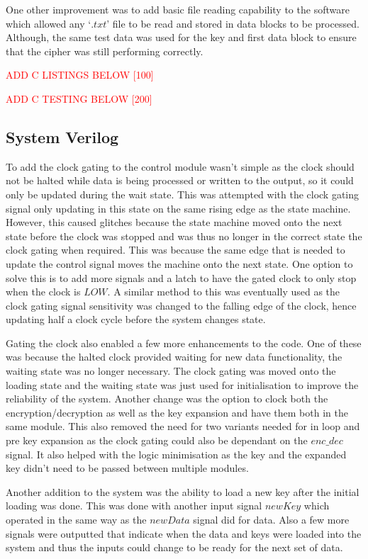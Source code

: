 \documentclass[12pt,twoside,a4paper]{report}
\begin{document}
	One other improvement was to add basic file reading capability to the software which allowed any  `$.txt$' file to be read and stored in data blocks to be processed. Although, the same test data was used for the key and first data block to ensure that the cipher was still performing correctly.
	
	\textcolor{red}{ADD C LISTINGS BELOW [100]}
    
	\textcolor{red}{ADD C TESTING BELOW [200]}   
    
	\subsection{System Verilog}
	\label{subsection:SV2}
	
	To add the clock gating to the control module wasn't simple as the clock should not be halted while data is being processed or written to the output, so it could only be updated during the wait state. This was attempted with the clock gating signal only updating in this state on the same rising edge as the state machine. However, this caused glitches because the state machine moved onto the next state before the clock was stopped and was thus no longer in the correct state the clock gating when required. This was because the same edge that is needed to update the control signal moves the machine onto the next state. One option to solve this is to add more signals and a latch to have the gated clock to only stop when the clock is $LOW$. A similar method to this was eventually used as the clock gating signal sensitivity was changed to the falling edge of the clock, hence updating half a clock cycle before the system changes state.
	
	Gating the clock also enabled a few more enhancements to the code. One of these was because the halted clock provided waiting for new data functionality, the waiting state was no longer necessary. The clock gating was moved onto the loading state and the waiting state was just used for initialisation to improve the reliability of the system. Another change was the option to clock both the encryption/decryption as well as the key expansion and have them both in the same module. This also removed the need for two variants needed for in loop and pre key expansion as the clock gating could also be dependant on the $enc\_dec$ signal. It also helped with the logic minimisation as the key and the expanded key didn't need to be passed between multiple modules.
	
	Another addition to the system was the ability to load a new key after the initial loading was done. This was done with another input signal $newKey$ which operated in the same way as the $newData$ signal did for data. Also a few more signals were outputted that indicate when the data and keys were loaded into the system and thus the inputs could change to be ready for the next set of data.
    
\end{document}
